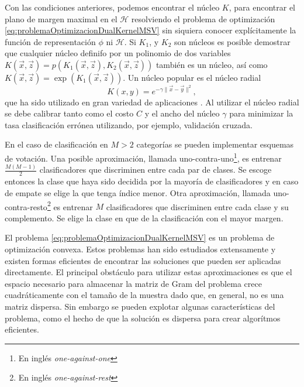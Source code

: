 \documentclass[letterpaper,12pt]{book}
\begin{document}
Con las condiciones anteriores, podemos encontrar el núcleo $K$, para encontrar el plano de margen maximal en el $\mathcal{H}$ resolviendo el problema de optimización \ref{eq:problemaOptimizacionDualKernelMSV} sin siquiera conocer explícitamente la función de representación $\phi$ ni $\mathcal{H}$. Si $K_1$, y $K_2$ son núcleos es posible demostrar que cualquier núcleo definifo por un polinomio de dos variables $K(\vec{x},\vec{z}) = p(K_1(\vec{x},\vec{z}),K_2(\vec{x},\vec{z}))$ también es un núcleo, así como $K(\vec{x},\vec{z})=\exp{(K_1(\vec{x},\vec{z}))}$. Un núcleo popular es el núcleo radial
\begin{equation}
K(x,y) = e^{-\gamma\|\vec{x}-\vec{y}\|^2},
\end{equation}
 que ha sido utilizado en gran variedad de aplicaciones \cite{cristianini_introduction_2000}. Al utilizar el núcleo radial se debe calibrar tanto como el costo $C$ y el ancho del núcleo $\gamma$ para minimizar la tasa clasificación errónea utilizando, por ejemplo, validación cruzada.

En el caso de clasificación en $M>2$ categorías se pueden implementar esquemas de votación. Una posible aproximación, llamada uno-contra-uno\footnote{En inglés \textit{one-against-one}}, es entrenar  $\frac{M(M-1)}{2}$ clasificadores que discriminen entre cada par de clases. Se escoge entonces la clase que haya sido decidida por la mayoría de clasificadores y en caso de empate se elige la que tenga índice menor. Otra aproximación, llamada uno-contra-resto\footnote{En inglés \textit{one-against-rest}} es entrenar $M$ clasificadores que discriminen entre cada clase y su complemento. Se elige la clase en que de la clasificación con el mayor margen.

El problema \ref{eq:problemaOptimizacionDualKernelMSV} es un problema de optimización convexa. Estos problemas han sido estudiados extensamente y existen formas eficientes de encontrar las soluciones que pueden ser aplicadas directamente. El principal obstáculo para utilizar estas aproximaciones es que el espacio necesario para almacenar la  matriz de Gram del problema crece cuadráticamente con el tamaño de la muestra dado que, en general, no es una matriz dispersa. Sin embargo se pueden explotar algunas características del problema, como el hecho de que la solución es dispersa para crear algorítmos eficientes. 
\end{document}
